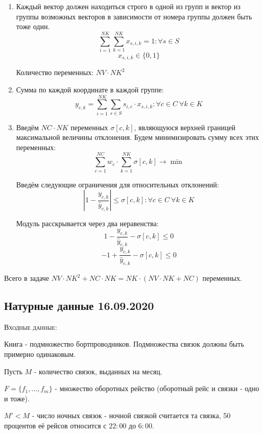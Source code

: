 \documentclass[%
10pt, %
final, %
oneside, %
onecolumn, %
centertags]{article} %
\theoremstyle{plain}
\theoremstyle{definition}
\theoremstyle{remark}
\begin{document}
\begin{enumerate}
	\item Каждый вектор должен находиться строго в одной из групп и вектор из группы возможных векторов в зависимости от номера группы должен быть тоже один.
	$$\sum\limits_{i=1}^{NK} \sum\limits_{k=1}^{NK}x_{s,i,k} = 1 : \forall s \in S $$
	$$x_{s,i,k} \in \{0,1\}$$

	Количество переменных: $NV\cdot NK^2$
	\item Сумма по каждой координате в каждой группе:
	$$y_{c,k} = \sum\limits_{i=1}^{NK} \sum\limits_{s\in S} s_{i,c} \cdot x_{s,i,k}:  \forall c \in C \  \forall k \in K $$
	\item Введём $NC\cdot NK$ переменных $\sigma[c,k]$, являющуюся верхней границей максимальной величины отклонения. Будем минимизировать сумму всех этих переменных:
	$$\sum\limits_{c=1}^{NC} w_c \cdot \sum\limits_{k=1}^{NK} \sigma[c,k] \to \min$$

	Введём следующие ограничения для относительных отклонений:
	$$\left\vert 1 - \frac{y_{c,k}}{\hat{y}_{c,k}}\right\vert \leq \sigma[c,k] : \forall c \in C \ \forall k \in K$$

	Модуль расскрывается через два неравенства:
	$$1 - \frac{y_{c,k}}{\hat{y}_{c,k}} - \sigma[c,k] \leq 0$$
	$$-1 + \frac{y_{c,k}}{\hat{y}_{c,k}} - \sigma[c,k] \leq 0$$ 
\end{enumerate}

Всего в задаче $NV\cdot NK^2 + NC \cdot NK = NK\cdot(NV \cdot NK + NC)$ переменных.

\newpage
\subsection{Натурные данные 16.09.2020}

\textsc{Входные данные}: 

Книга - подмножество бортпроводников. Подмножества связок должны быть примерно одинаковым.

Пусть $M$ - количество связок, выданных на месяц. 

$F = \{f_1,\ldots,f_m\}$ - множество оборотных рейство (оборотный рейс и связки - одно и тоже).

$M' < M$  - число ночных связок - ночной связкой считается та связка, 50 процентов её рейсов относится с $22:00$ до $6:00$.
\end{document}
